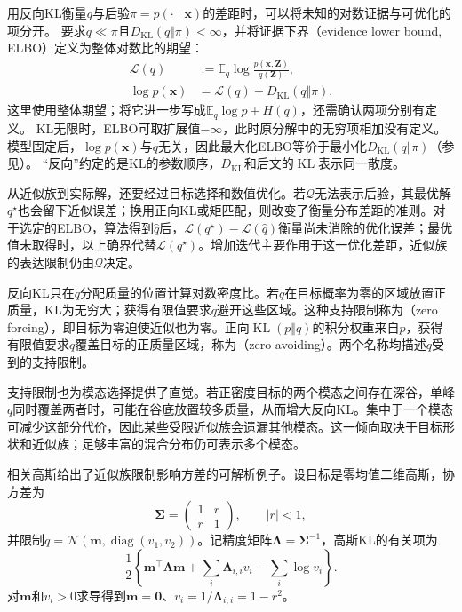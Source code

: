用反向KL衡量$q$与后验$\pi=p(\cdot\mid\bm x)$的差距时，可以将未知的对数证据与可优化的项分开。
要求$q\ll\pi$且$D_{\mathrm{KL}}(q\Vert\pi)<\infty$，并将证据下界（evidence lower bound, ELBO）定义为整体对数比的期望：
\begin{equation}
  \begin{aligned}
    \mathcal L(q)
      &:=\mathbb E_q\log\frac{p(\bm x,\bm Z)}{q(\bm Z)},\\
    \log p(\bm{x})
      &=\mathcal L(q)+D_{\mathrm{KL}}(q\Vert\pi).
  \end{aligned}
  \label{eq:pgm-variational-elbo}
\end{equation}
这里使用整体期望；将它进一步写成$\mathbb E_q\log p+H(q)$，还需确认两项分别有定义。
KL无限时，ELBO可取扩展值$-\infty$，此时原分解中的无穷项相加没有定义。
模型固定后，$\log p(\bm x)$与$q$无关，因此最大化ELBO等价于最小化$D_{\mathrm{KL}}(q\Vert\pi)$（参见）。
“反向”约定的是KL的参数顺序，$D_{\mathrm{KL}}$和后文的$\operatorname{KL}$表示同一散度。


从近似族到实际解，还要经过目标选择和数值优化。若$\mathcal Q$无法表示后验，其最优解$q^\star$也会留下近似误差；换用正向KL或矩匹配，则改变了衡量分布差距的准则。对于选定的ELBO，算法得到$\widehat q$后，$\mathcal L(q^\star)-\mathcal L(\widehat q)$衡量尚未消除的优化误差；最优值未取得时，以上确界代替$\mathcal L(q^\star)$。增加迭代主要作用于这一优化差距，近似族的表达限制仍由$\mathcal Q$决定。

反向KL只在$q$分配质量的位置计算对数密度比。若$q$在目标概率为零的区域放置正质量，KL为无穷大；获得有限值要求$q$避开这些区域。这种支持限制称为（zero forcing），即目标为零迫使近似也为零。正向$\operatorname{KL}(p\Vert q)$的积分权重来自$p$，获得有限值要求$q$覆盖目标的正质量区域，称为（zero avoiding）。两个名称均描述$q$受到的支持限制。

支持限制也为模态选择提供了直觉。若正密度目标的两个模态之间存在深谷，单峰$q$同时覆盖两者时，可能在谷底放置较多质量，从而增大反向KL。集中于一个模态可减少这部分代价，因此某些受限近似族会遗漏其他模态。这一倾向取决于目标形状和近似族；足够丰富的混合分布仍可表示多个模态。

相关高斯给出了近似族限制影响方差的可解析例子。设目标是零均值二维高斯，协方差为
\[
  \bm{\Sigma}=
  \begin{pmatrix}1&r\\r&1\end{pmatrix},
  \qquad |r|<1,
\]
并限制$q=\mathcal N(\bm{m},\operatorname{diag}(v_1,v_2))$。记精度矩阵$\bm{\Lambda}=\bm{\Sigma}^{-1}$，高斯KL的有关项为
\[
  \frac12\left\{\bm{m}^{\top}\bm{\Lambda}\bm{m}
     +\sum_i\bm{\Lambda}_{i,i}v_i-\sum_i\log v_i\right\}.
\]
对$\bm{m}$和$v_i>0$求导得到$\bm{m}=\bm{0}$、$v_i=1/\bm{\Lambda}_{i,i}=1-r^2$。

